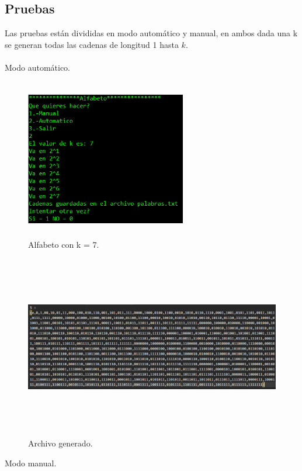 \documentclass[12pt, titlepage]{article}
\begin{document}
	\subsection{Pruebas}
	Las pruebas están divididas en modo automático y manual, en ambos dada una k se generan todas las cadenas de longitud 1 hasta $k$.
	\\\\
	{\large Modo automático.}
	\begin{figure}[H]
		\begin{center}
			\includegraphics[width=7cm, height=7cm]{img/automatico-alfabeto.png}
			\caption{Alfabeto con k = 7.}
			\label{fig:alfabeto1}
		\end{center}
	\end{figure}
	\begin{figure}[H]
		\begin{center}
			\includegraphics[width=\linewidth, height=8cm]{img/automatico-alfabeto-salida.png}
			\caption{Archivo generado.}
			\label{fig:alfabeto2}
		\end{center}
	\end{figure}
	{\large Modo manual.}
\end{document}
